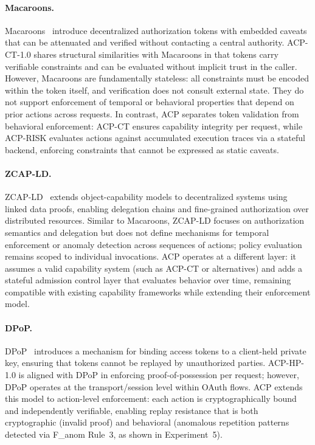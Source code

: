 \documentclass[11pt]{article}
\theoremstyle{definition}
\begin{document}
\paragraph{Macaroons.}
Macaroons~\cite{birgisson2014macaroons} introduce decentralized authorization tokens
with embedded caveats that can be attenuated and verified without contacting a central
authority.
ACP-CT-1.0 shares structural similarities with Macaroons in that tokens carry verifiable
constraints and can be evaluated without implicit trust in the caller.
However, Macaroons are fundamentally stateless: all constraints must be encoded within the
token itself, and verification does not consult external state.
They do not support enforcement of temporal or behavioral properties that depend on prior
actions across requests.
In contrast, ACP separates token validation from behavioral enforcement: ACP-CT ensures
capability integrity per request, while ACP-RISK evaluates actions against accumulated
execution traces via a stateful backend, enforcing constraints that cannot be expressed as
static caveats.

\paragraph{ZCAP-LD.}
ZCAP-LD~\cite{zcapld} extends object-capability models to decentralized systems using
linked data proofs, enabling delegation chains and fine-grained authorization over
distributed resources.
Similar to Macaroons, ZCAP-LD focuses on authorization semantics and delegation but does
not define mechanisms for temporal enforcement or anomaly detection across sequences of
actions; policy evaluation remains scoped to individual invocations.
ACP operates at a different layer: it assumes a valid capability system (such as ACP-CT or
alternatives) and adds a stateful admission control layer that evaluates behavior over
time, remaining compatible with existing capability frameworks while extending their
enforcement model.

\paragraph{DPoP.}
DPoP~\cite{rfc9449} introduces a mechanism for binding access tokens to a client-held
private key, ensuring that tokens cannot be replayed by unauthorized parties.
ACP-HP-1.0 is aligned with DPoP in enforcing proof-of-possession per request; however,
DPoP operates at the transport/session level within OAuth flows.
ACP extends this model to action-level enforcement: each action is cryptographically bound
and independently verifiable, enabling replay resistance that is both cryptographic
(invalid proof) and behavioral (anomalous repetition patterns detected via F\_anom
Rule~3, as shown in Experiment~5).
\end{document}
